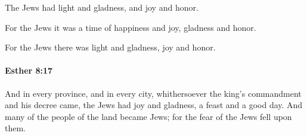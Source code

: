 			\begin{versebox}
					\item[BHS] 
					\item[LXX] 
					\item[ASV] The Jews had light and gladness, and joy and honor.
					\item[NIV] For the Jews it was a time of happiness and joy, gladness and honor.
					\item[NRSV] For the Jews there was light and gladness, joy and honor.
			\end{versebox}

		\paragraph{Esther 8:17} %
			\label{ESTHER-8-17}

			And in every province, and in every city, whithersoever the king’s commandment and his decree came, the Jews had joy and gladness, a feast and a good day. And many of the people of the land became Jews; for the fear of the Jews fell upon them.

